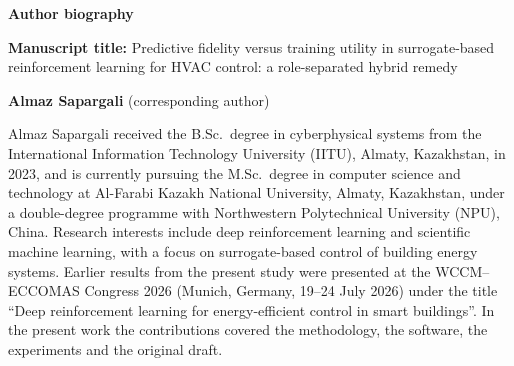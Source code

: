 \documentclass[12pt,a4paper]{article}
\begin{document}
{\large\bfseries Author biography\par}

\textbf{Manuscript title:} Predictive fidelity versus training utility in surrogate-based
reinforcement learning for HVAC control: a role-separated hybrid remedy

\vspace{10pt}
\textbf{Almaz Sapargali} (corresponding author)

Almaz Sapargali received the B.Sc.\ degree in cyberphysical systems from the International
Information Technology University (IITU), Almaty, Kazakhstan, in 2023, and is currently pursuing
the M.Sc.\ degree in computer science and technology at Al-Farabi Kazakh National University,
Almaty, Kazakhstan, under a double-degree programme with Northwestern Polytechnical University
(NPU), China. Research interests include deep reinforcement learning and scientific machine
learning, with a focus on surrogate-based control of building energy systems. Earlier results from
the present study were presented at the WCCM--ECCOMAS Congress 2026 (Munich, Germany, 19--24 July
2026) under the title ``Deep reinforcement learning for energy-efficient control in smart
buildings''. In the present work the contributions covered the methodology, the software, the
experiments and the original draft.
\end{document}
